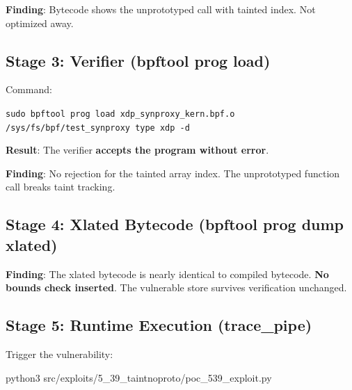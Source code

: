 \noindent
\textbf{Finding}: Bytecode shows the unprototyped call with tainted index. Not optimized away.

\subsection{Stage 3: Verifier (bpftool prog load)}

Command:
\begin{tcolorbox}[colback=gray!10, colframe=gray!10, arc=2pt, boxrule=0pt]
\small\ttfamily
\texttt{sudo bpftool prog load xdp\_synproxy\_kern.bpf.o /sys/fs/bpf/test\_synproxy type xdp -d}
\end{tcolorbox}

\noindent
\textbf{Result}: The verifier \textbf{accepts the program without error}.

\noindent
\textbf{Finding}: No rejection for the tainted array index. The unprototyped function call breaks taint tracking.

\subsection{Stage 4: Xlated Bytecode (bpftool prog dump xlated)}

\vspace{0.3cm}
\noindent
{}
\vspace{0.3cm}

\noindent
\textbf{Finding}: The xlated bytecode is nearly identical to compiled bytecode. \textbf{No bounds check inserted}. The vulnerable store survives verification unchanged.

\subsection{Stage 5: Runtime Execution (trace\_pipe)}

Trigger the vulnerability:

\begin{tcolorbox}[colback=gray!10, colframe=gray!10, arc=2pt, boxrule=0pt]
\small\ttfamily
python3 src/exploits/5\_39\_taintnoproto/poc\_539\_exploit.py 
\end{tcolorbox}

